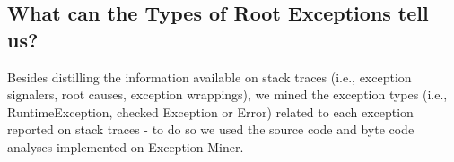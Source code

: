 \documentclass[conference]{IEEEtran}
\begin{document}



\subsection{What can the Types of Root Exceptions tell us?}

Besides distilling the information available on stack traces (i.e., exception signalers, root causes, exception wrappings),
we mined the exception types (i.e., RuntimeException, checked Exception or Error) related to each exception reported on stack traces -
to do so we used the source code and byte code analyses implemented on Exception Miner. 
\end{document}
